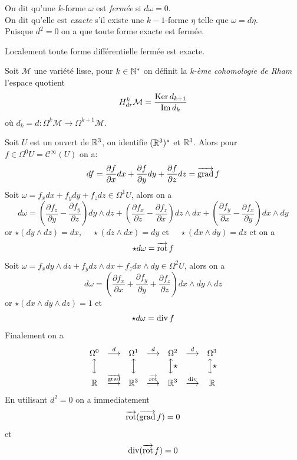 \documentclass[12pt, a4paper]{book}
\begin{document}
\begin{defi}
On dit qu'une $k$-forme $\omega$ est \emph{fermée} si $d\omega = 0$. \\
On dit qu'elle est \emph{exacte} s'il existe une $k-1$-forme $\eta$ telle que $\omega = d\eta$. \\
Puisque $d^2 = 0$ on a que toute forme exacte est fermée.
\end{defi}

\begin{pro}
Localement toute forme différentielle fermée est exacte.
\end{pro}

\begin{defi}
Soit $\mathcal{M}$ une variété lisse, pour $k\in \mathbb{N}^*$ on définit la \emph{k-ème cohomologie de Rham} l'espace quotient 
$$H_{dr}^k\mathcal{M} = \frac{\operatorname{Ker} d_{k+1}}{\operatorname{Im} d_k}$$
où $d_k = d: \Omega^k\mathcal{M} \to \Omega^{k+1}\mathcal{M}$.
\end{defi}

\begin{exe}
Soit $U$ est un ouvert de $\mathbb{R}^3$, on identifie $(\mathbb{R}^3)^*$ et $\mathbb{R}^3$. Alors pour $f \in \Omega^0U = \mathscr{C}^\infty(U)$ on a:
$$df = \frac{\partial f}{\partial x} dx + \frac{\partial f}{\partial y} dy + \frac{\partial f}{\partial z} dz = \operatorname{\overrightarrow{\text{grad}}} f$$
Soit $\omega = f_x dx + f_y dy + f_z dz \in \Omega^1U$, alors on a
$$d\omega = \left(\frac{\partial f_z}{\partial y} - \frac{\partial f_y}{\partial z}\right)dy\wedge dz + \left(\frac{\partial f_x}{\partial z} - \frac{\partial f_z}{\partial x}\right)dz\wedge dx + \left(\frac{\partial f_y}{\partial x} - \frac{\partial f_x}{\partial y}\right)dx\wedge dy$$
or $\star (dy\wedge dz) = dx$, $\quad\star (dz\wedge dx) = dy$ et $\quad\star (dx\wedge dy) = dz$ et on a 
$$\star d\omega = \operatorname{\overrightarrow{\text{rot}}} f$$ 
Soit $\omega = f_x dy\wedge dz + f_y dz\wedge dx + f_z dx \wedge dy \in \Omega^2U$, alors on a 
$$d\omega = \left(\frac{\partial f_x}{\partial x} + \frac{\partial f_y}{\partial y} + \frac{\partial f_z}{\partial z}\right) dx\wedge dy\wedge dz$$
or $\star (dx\wedge dy\wedge dz) = 1$ et
$$\star d\omega = \operatorname{div} f$$
Finalement on a 
$$\begin{matrix}
\Omega^0 & \overset{d}{\longrightarrow} & \Omega^1 & \overset{d}{\longrightarrow} & \Omega^2 & \overset{d}{\longrightarrow} & \Omega^3\\
\Big\updownarrow &  & \Big\updownarrow &  & \Big\updownarrow\star &  & \Big\updownarrow\star\\
\mathbb{R} & \overset{\operatorname{\overrightarrow{\text{grad}}}}{\longrightarrow} & \mathbb{R}^3 & \overset{\operatorname{\overrightarrow{\text{rot}}}}{\longrightarrow} & \mathbb{R}^3 & \overset{\operatorname{div}}{\longrightarrow} & \mathbb{R}
\end{matrix}
$$
En utilisant $d^2 = 0$ on a immediatement 
$$\operatorname{\overrightarrow{\text{rot}}}(\operatorname{\overrightarrow{\text{grad}}} f) = 0 $$
et 
$$\operatorname{div}(\operatorname{\overrightarrow{\text{rot}}} f) = 0$$
\end{exe}
\end{document}
